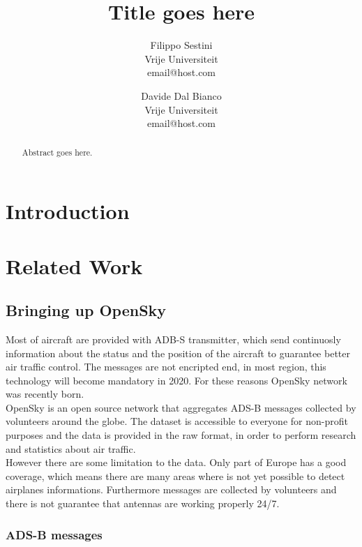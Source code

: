\documentclass{vldb}
\title{Title goes here}
\author{Filippo Sestini \\ Vrije Universiteit \\ email@host.com \and
  Davide Dal Bianco \\ Vrije Universiteit \\ email@host.com}
\begin{document}
\maketitle

\begin{abstract}
Abstract goes here.  
\end{abstract}

\section{Introduction}

\section{Related Work}

\subsection{Bringing up OpenSky}
Most of aircraft are provided with ADB-S transmitter, which send continuosly information about the status and the position of the aircraft to guarantee better air traffic control. The messages are not encripted end, in most region, this technology will become mandatory in 2020. For these reasons OpenSky network was recently born. \\
OpenSky is an open source network that aggregates ADS-B messages collected by volunteers around the globe. The dataset is accessible to everyone for non-profit purposes and the data is provided in the raw format, in order to perform research and statistics about air traffic. \\
However there are some limitation to the data. Only part of Europe has a good coverage, which means there are many areas where is not yet possible to detect airplanes informations. Furthermore messages are collected by volunteers and there is not guarantee that antennas are working properly 24/7.

    \subsubsection{ADS-B messages}
\end{document}
